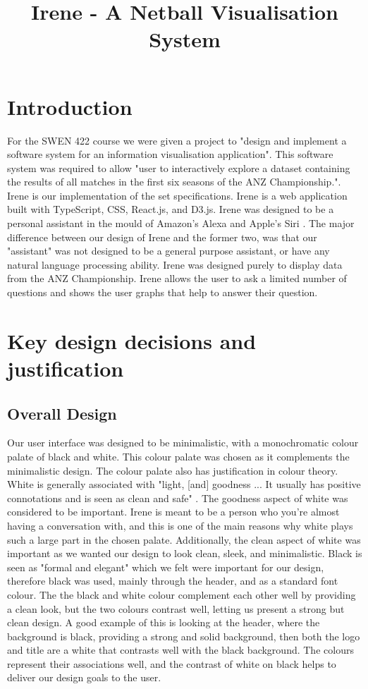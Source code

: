 \documentclass[10pt, journal]{IEEEtran}
\begin{document}
\title{Irene - A Netball Visualisation System}
\author{
}
\maketitle


\section{Introduction}
For the SWEN 422 course we were given a project to "design and implement a software system for an information visualisation application". This software system was required to allow "user to interactively explore a dataset containing the results of all matches in the first six seasons of the ANZ Championship.". Irene \cite{irene} is our implementation of the set specifications. Irene is a web application built with TypeScript, CSS, React.js, and D3.js. Irene was designed to be a personal assistant in the mould of Amazon's Alexa \cite{alexa} and Apple's Siri \cite{siri}. The major difference between our design of Irene and the former two, was that our "assistant" was not designed to be a general purpose assistant, or have any natural language processing ability. Irene was designed purely to display data from the ANZ Championship. Irene allows the user to ask a limited number of questions and shows the user graphs that help to answer their question. 


\section{Key design decisions and justification}

\subsection{Overall Design}
Our user interface was designed to be minimalistic, with a monochromatic colour palate of black and white. This colour palate was chosen as it complements the minimalistic design. The colour palate also has justification in colour theory. White is generally associated with "light, [and] goodness ... It usually has positive connotations and is seen as clean and safe" \cite{color}. The goodness aspect of white was considered to be important. Irene is meant to be a person who you're almost having a conversation with, and this is one of the main reasons why white plays such a large part in the chosen palate. Additionally, the clean aspect of white was important as we wanted our design to look clean, sleek, and minimalistic.  Black is seen as "formal and elegant" which we felt were important for our design, therefore black was used, mainly through the header, and as a standard font colour. The the black and white colour complement each other well by providing a clean look, but the two colours contrast well, letting us present a strong but clean design. A good example of this is looking at the header, where the background is black, providing a strong and solid background, then both the logo and title are a white that contrasts well with the black background. The colours represent their associations well, and the contrast of white on black helps to deliver our design goals to the user. 
\end{document}
